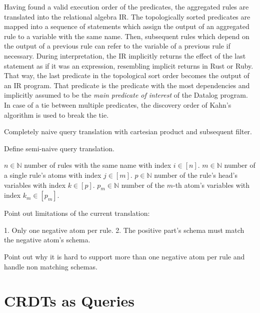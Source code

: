 Having found a valid execution order of the predicates,
the aggregated rules are translated into the relational algebra \ac{IR}.
The topologically sorted predicates are mapped into a sequence of statements
which assign the output of an aggregated rule to a variable with the same name.
Then, subsequent rules which depend on the output of a previous rule can refer
to the variable of a previous rule if necessary.
During interpretation, the \ac{IR} implicitly returns the effect
of the last statement as if it was an expression,
resembling implicit returns in Rust or Ruby.
That way, the last predicate in the topological sort order becomes the output
of an \ac{IR} program.
That predicate is the predicate with the most dependencies and implicitly
assumed to be the \emph{main predicate of interest} of the Datalog program.
In case of a tie between multiple predicates, the discovery order of Kahn's
algorithm is used to break the tie\footnotemark{}.



Completely naive query translation with cartesian product and subsequent filter.

Define semi-naive query translation.

\(n \in \mathbb{N}\) number of rules with the same name with index \(i \in [n]\).
\(m \in \mathbb{N}\) number of a single rule's atoms with index \(j \in [m]\).
\(p \in \mathbb{N}\) number of the rule's head's variables with index \(k \in [p]\).
\(p_m \in \mathbb{N}\) number of the \(m\)-th atom's variables with index \(k_m \in [p_m]\).

Point out limitations of the current translation:

1. Only one negative atom per rule.
2. The positive part's schema must match the negative atom's schema.

Point out why it is hard to support more than one negative atom per rule
and handle non matching schemas.



\section{\acp{CRDT} as Queries}\label{sec:crdts-as-queries}
